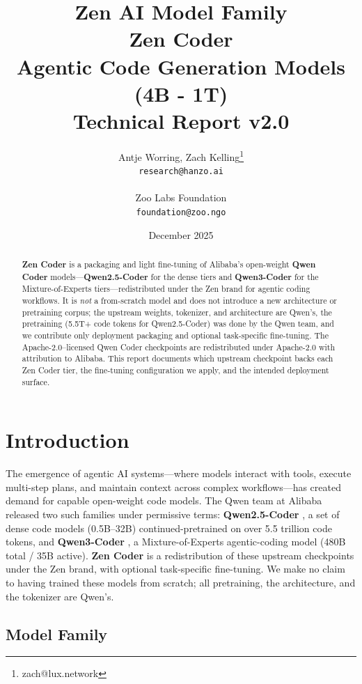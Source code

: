 \documentclass[11pt,a4paper]{article}
\title{
    \vspace{-2cm}
    \Large \textbf{Zen AI Model Family} \\
    \vspace{0.5cm}
    \Huge \textbf{Zen Coder} \\
    \vspace{0.3cm}
    \large Agentic Code Generation Models (4B - 1T) \\
    \vspace{0.5cm}
    \normalsize Technical Report v2.0
}
\author{
    Antje Worring, Zach Kelling\thanks{zach@lux.network} \\
    \texttt{research@hanzo.ai} \\
    \\
    Zoo Labs Foundation \\
    \texttt{foundation@zoo.ngo}
}
\date{December 2025}
\begin{document}
\maketitle

\begin{abstract}
\textbf{Zen Coder} is a packaging and light fine-tuning of Alibaba's open-weight
\textbf{Qwen Coder} models---\textbf{Qwen2.5-Coder} \cite{qwen25coder} for the dense
tiers and \textbf{Qwen3-Coder} \cite{qwen3coder} for the Mixture-of-Experts tiers---redistributed
under the Zen brand for agentic coding workflows. It is \emph{not} a from-scratch model and does not
introduce a new architecture or pretraining corpus; the upstream weights, tokenizer, and
architecture are Qwen's, the pretraining (5.5T+ code tokens for Qwen2.5-Coder) was done by the
Qwen team, and we contribute only deployment packaging and optional task-specific fine-tuning.
The Apache-2.0--licensed Qwen Coder checkpoints are redistributed under Apache-2.0 with attribution
to Alibaba. This report documents which upstream checkpoint backs each Zen Coder tier, the
fine-tuning configuration we apply, and the intended deployment surface.
\end{abstract}

\tableofcontents
\newpage

\section{Introduction}

The emergence of agentic AI systems---where models interact with tools, execute multi-step plans, and
maintain context across complex workflows---has created demand for capable open-weight code models.
The Qwen team at Alibaba released two such families under permissive terms: \textbf{Qwen2.5-Coder}
\cite{qwen25coder}, a set of dense code models (0.5B--32B) continued-pretrained on over 5.5 trillion
code tokens, and \textbf{Qwen3-Coder} \cite{qwen3coder}, a Mixture-of-Experts agentic-coding model
(480B total / 35B active). \textbf{Zen Coder} is a redistribution of these upstream checkpoints under
the Zen brand, with optional task-specific fine-tuning. We make no claim to having trained these
models from scratch; all pretraining, the architecture, and the tokenizer are Qwen's.

\subsection{Model Family}
\end{document}
